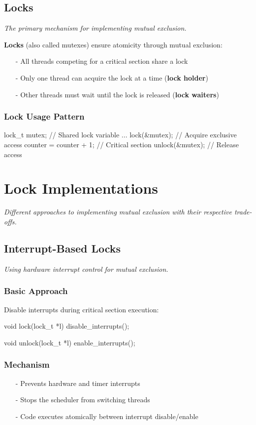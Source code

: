 \documentclass[../../compsys.tex]{subfiles}
\begin{document}
\subsection{Locks}
\textit{The primary mechanism for implementing mutual exclusion.}

\textbf{Locks} (also called mutexes) ensure atomicity through mutual exclusion:
\begin{itemize}
  \item[-] All threads competing for a critical section share a lock
  \item[-] Only one thread can acquire the lock at a time (\textbf{lock holder})
  \item[-] Other threads must wait until the lock is released (\textbf{lock waiters})
\end{itemize}

\subsubsection{Lock Usage Pattern}
\begin{cc}
lock_t mutex;           // Shared lock variable
...
lock(&mutex);           // Acquire exclusive access
counter = counter + 1;  // Critical section
unlock(&mutex);         // Release access
\end{cc}
\newpage
\section{Lock Implementations}
\textit{Different approaches to implementing mutual exclusion with their respective trade-offs.}

\subsection{Interrupt-Based Locks}
\textit{Using hardware interrupt control for mutual exclusion.}

\subsubsection{Basic Approach}
Disable interrupts during critical section execution:

\begin{cc}
void lock(lock_t *l) {
    disable_interrupts();
}

void unlock(lock_t *l) {
    enable_interrupts();
}
\end{cc}

\subsubsection{Mechanism}
\begin{itemize}
  \item[-] Prevents hardware and timer interrupts
  \item[-] Stops the scheduler from switching threads
  \item[-] Code executes atomically between interrupt disable/enable
\end{itemize}
\end{document}
